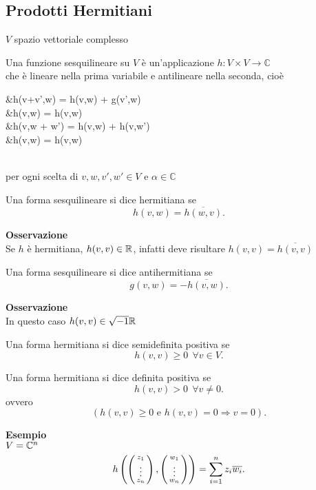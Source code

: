 \documentclass[12px]{article}
\begin{document}
	\subsection{Prodotti Hermitiani}
	$V$ spazio vettoriale complesso
	\begin{defi}
		Una funzione sesquilineare su $V$ è un'applicazione $h: V\times V \rightarrow \mathbb{C}$\\
		che è lineare nella prima variabile e antilineare nella seconda, cioè\\[10px]
		\begin{aligned}
			\hspace{80px}&h(v+v',w) = h(v,w) + g(v',w)\\
		&h(\alpha v,w) = \alpha h(v,w)\\
		&h(v,w + w') = h(v,w) + h(v,w')\\
			&h(v,\alpha w) = \overline{\alpha}h(v,w)\\
		\end{aligned}\\[10px]
		per ogni scelta di $v,w,v',w'\in V$ e $\alpha \in\mathbb{C}$
	\end{defi}
	\begin{defi}
		Una forma sesquilineare si dice hermitiana se
		\[
			h(v,w) = \overline{h(w,v)}
		.\] 
	\end{defi}
	\textbf{Osservazione}\\
	Se $h$ è hermitiana, $h(v,v)\in\mathbb{R}$, infatti deve risultare $h(v,v) = \overline{h(v,v)}$
	\begin{defi}
		Una forma sesquilineare si dice antihermitiana se 
		\[
			g(v,w) = - \overline{h(v,w)}
		.\] 
	\end{defi}
	\textbf{Osservazione}\\
	In questo caso $h(v,v)\in\sqrt{-1}\mathbb{R}$\\	
	\begin{defi}
		Una forma hermitiana si dice semidefinita positiva se 
		\[
		h(v,v) \geq 0 \ \ \forall v\in V
		.\] 
	\end{defi}
	\begin{defi}
		Una forma hermitiana si dice definita positiva se 
		\[
		h(v,v)>0 \ \ \forall v \neq 0
		.\] 
		ovvero
		\[
			(h(v,v)\geq 0 \text{ e }h(v,v) = 0 \Rightarrow v=0)
		.\] 
	\end{defi}
	\textbf{Esempio}\\
	$V = \mathbb{C}^n$
	\[
		h\left( \left(\begin{smallmatrix}z_1\\ \vdots \\ z_n\end{smallmatrix}\right),\left(\begin{smallmatrix}w_1\\\vdots\\w_n\end{smallmatrix}\right)\right) = \sum^n_{i=1}z_i\overline{w_i}
	.\] 
\end{document}
